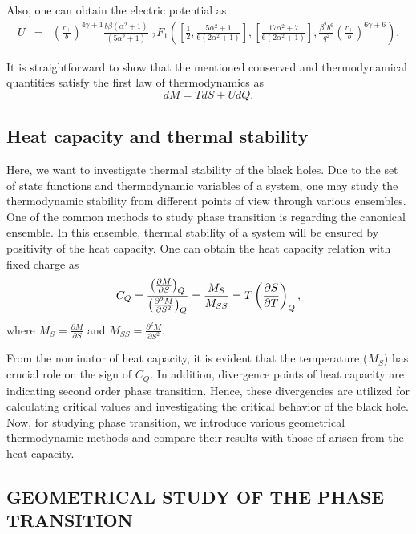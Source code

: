 \documentclass[aps,onecolumn ]{revtex4}
\begin{document}
Also, one can obtain the electric potential as
\begin{eqnarray}
U &=&\left(\frac{r_{+}}{b}\right)^{4\gamma+1 }\frac{b\beta (\alpha
^{2}+1)}{ (5\alpha ^{2}+1)}\;{}_{2}F_{1}\left( \left[
\frac{1}{2},\frac{5\alpha ^{2}+1}{6(2\alpha ^{2}+1)}\right]
,\left[ \frac{17\alpha ^{2}+7}{6(2\alpha ^{2}+1)}\right]
,\frac{\beta
^{2}b^{6}}{q^{2}}\left(\frac{r_{+}}{b}\right)^{6\gamma+6 }\right)
.\label{U}
\end{eqnarray}

It is straightforward to show that the mentioned conserved and
thermodynamical quantities satisfy the first law of thermodynamics as
\begin{equation}
dM=TdS+UdQ.  \label{1stLAW}
\end{equation}

\subsection{Heat capacity and thermal stability}

Here, we want to investigate thermal stability of the black holes. Due to
the set of state functions and thermodynamic variables of a system, one may
study the thermodynamic stability from different points of view through
various ensembles. One of the common methods to study phase transition is
regarding the canonical ensemble. In this ensemble, thermal stability of a
system will be ensured by positivity of the heat capacity. One can obtain
the heat capacity relation with fixed charge as
\begin{equation}
C_{Q}=\frac{\left( \frac{\partial M}{\partial S}\right) _{Q}}{\left( \frac{%
\partial ^{2}M}{\partial S^{2}}\right) _{Q}}=\frac{M_{S}}{M_{SS}}=T\left(
\frac{\partial S}{\partial T}\right) _{Q},  \label{CQ}
\end{equation}%
where $M_{S}=\frac{\partial M}{\partial S}$ and $M_{SS}=\frac{\partial ^{2}M%
}{\partial S^{2}}$.

From the nominator of heat capacity, it is evident that the
temperature ($M_{S}$) has crucial role on the sign of $C_{Q}$. In
addition, divergence points of heat capacity are indicating second
order phase transition. Hence, these divergencies are utilized for
calculating critical values and investigating the critical
behavior of the black hole. Now, for studying phase transition, we
introduce various geometrical thermodynamic methods and compare
their results with those of arisen from the heat capacity.

\subsection{GEOMETRICAL STUDY OF THE PHASE TRANSITION}
\end{document}
